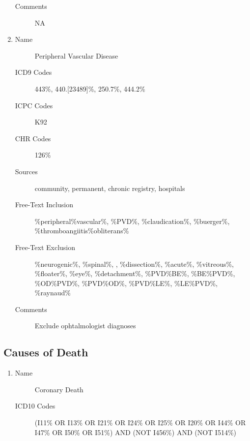 \documentclass[a4paper,12pt]{article}
\begin{document}
\begin{appendices}
\begin{enumerate}
\begin{description}
   						\item[Comments] NA
   					\end{description}
   					\item
   					\begin{description}
   						\item[Name] Peripheral Vascular Disease
   						\item[ICD9 Codes] 443\%, 440.[23489]\%, 250.7\%, 444.2\%
   						\item[ICPC Codes] K92
   						\item[CHR Codes] 126\%
   						\item[Sources] community, permanent, chronic registry, hospitals
   						\item[Free-Text Inclusion] \%peripheral\%vascular\%, \%PVD\%, \%claudication\%, \%buerger\%, \%thromboangiitis\%obliterans\%
   						\item[Free-Text Exclusion] \%neurogenic\%, \%spinal\%, , \%dissection\%, \%acute\%, \%vitreous\%, \%floater\%, \%eye\%, \%detachment\%, \%PVD\%BE\%, \%BE\%PVD\%, \%OD\%PVD\%, \%PVD\%OD\%, \%PVD\%LE\%, \%LE\%PVD\%, \%raynaud\%
   						\item[Comments] Exclude ophtalmologist diagnoses
   					\end{description}
	   			\end{enumerate}
   			
   			\subsection{Causes of Death}
   				\begin{enumerate}
   					\item
   					\begin{description}
   						\item[Name] Coronary Death
   						\item[ICD10 Codes] (I11\% OR I13\% OR I21\% OR I24\% OR I25\% OR I20\% OR I44\% OR I47\% OR I50\% OR I51\%) AND (NOT I456\%) AND (NOT I514\%)
   					\end{description}
   				\end{enumerate}
	   			             

\end{appendices}
\end{document}
